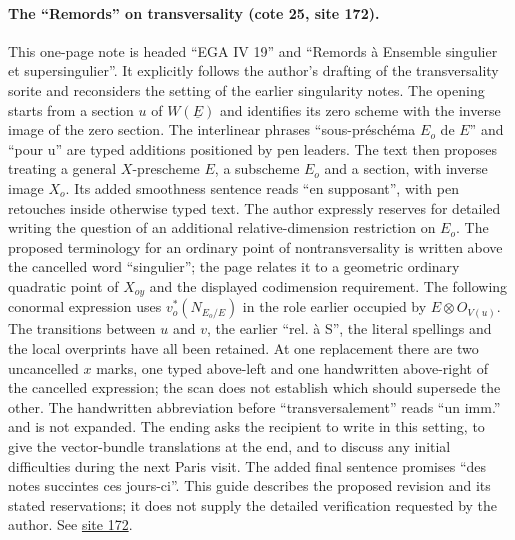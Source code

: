\paragraph{The ``Remords'' on transversality (cote 25, site 172).}
This one-page note is headed ``EGA IV 19'' and ``Remords à Ensemble singulier et supersingulier''. It explicitly follows the author's drafting of the transversality sorite and reconsiders the setting of the earlier singularity notes. The opening starts from a section $u$ of $W(\underline E)$ and identifies its zero scheme with the inverse image of the zero section. The interlinear phrases ``sous-préschéma $E_o$ de $E$'' and ``pour u'' are typed additions positioned by pen leaders. The text then proposes treating a general $X$-prescheme $E$, a subscheme $E_o$ and a section, with inverse image $X_o$. Its added smoothness sentence reads ``en supposant'', with pen retouches inside otherwise typed text. The author expressly reserves for detailed writing the question of an additional relative-dimension restriction on $E_o$. The proposed terminology for an ordinary point of nontransversality is written above the cancelled word ``singulier''; the page relates it to a geometric ordinary quadratic point of $X_{oy}$ and the displayed codimension requirement. The following conormal expression uses $v_o^*(N_{E_o/E})$ in the role earlier occupied by $E\otimes O_{V(u)}$. The transitions between $u$ and $v$, the earlier ``rel. à S'', the literal spellings and the local overprints have all been retained. At one replacement there are two uncancelled $x$ marks, one typed above-left and one handwritten above-right of the cancelled expression; the scan does not establish which should supersede the other. The handwritten abbreviation before ``transversalement'' reads ``un imm.'' and is not expanded. The ending asks the recipient to write in this setting, to give the vector-bundle translations at the end, and to discuss any initial difficulties during the next Paris visit. The added final sentence promises ``des notes succintes ces jours-ci''. This guide describes the proposed revision and its stated reservations; it does not supply the detailed verification requested by the author. See \href{https://grothendieck.umontpellier.fr/web/viewer.html?file=../25.pdf#page=173}{site 172}.
